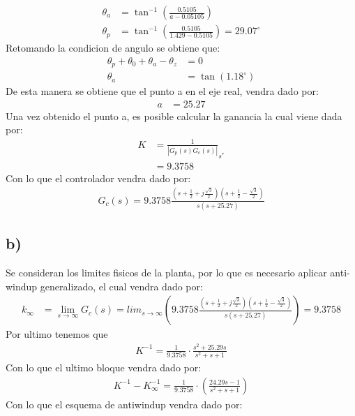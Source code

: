 \documentclass[
  11pt,
  letterpaper,
   addpoints,
   answers
  ]{exam}
\begin{document}
\begin{questions}
\begin{solution}
\begin{align}
        \theta_a &= \tan^{-1}\left( \frac{0.5105}{a - 0.05105}\right) \\
        \theta_p &= \tan^{-1}\left( \frac{0.5105}{1.429 - 0.5105}\right) = 29.07^{\circ}
    \end{align}
    Retomando la condicion de angulo se obtiene que:
    \begin{align}
        \theta_p + \theta_0 + \theta_a - \theta_z &= 0\\
        \theta_{a}&=\tan(1.18^{\circ})
    \end{align}
    De esta manera se obtiene que el punto a en el eje real, vendra dado por:
    \begin{align}
        a &=25.27
    \end{align}
    Una vez obtenido el punto a, es posible calcular la ganancia la cual viene dada por:
    \begin{align}
        K &= \frac{1}{|G_{p}(s)G_{c}(s)|}_{s^{*}}\\
        &=9.3758
    \end{align}
    Con lo que el controlador vendra dado por:
    \begin{align}
        G_{c}(s) = 9.3758 \frac{\left(s + \frac{1}{2} + j\frac{\sqrt{3}}{2}\right)\left(s+ \frac{1}{2} - \frac{\sqrt{3}}{2}\right)}{s(s+25.27)}
    \end{align}
    \subsection*{b)}
    Se consideran los limites fisicos de la planta, por lo que es necesario aplicar anti-windup generalizado, el cual vendra dado por:
    \begin{align}
        k_{\infty} &= \lim_{s \to \infty} 
            G_{c}(s) = lim_{s \to \infty} \left(9.3758 \frac{\left(s + \frac{1}{2} + j\frac{\sqrt{3}}{2}\right)\left(s+ \frac{1}{2} - \frac{\sqrt{3}}{2}\right)}{s(s+25.27)}\right)
        = 9.3758
    \end{align}
Por ultimo tenemos que
\begin{align}
    K^{-1} = \frac{1}{9.3758} \cdot \frac{s^{2} + 25.29s}{s^{2}+s +1}
\end{align}
Con lo que el ultimo bloque vendra dado por:
\begin{align}
    K^{-1} - K_{\infty}^{-1} = \frac{1}{9.3758} \cdot \left(\frac{24.29s-1}{s^{2}+s+1}\right)
\end{align}
Con lo que el esquema de antiwindup vendra dado por:

\end{solution}
\end{questions}
\end{document}
